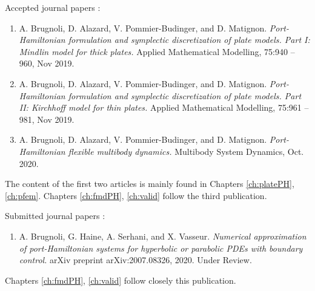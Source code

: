 Accepted journal papers \cite{brugnoli2019ammmin,brugnoli2019ammkir,brugnoli2020msd}:
\begin{enumerate}
\item A. Brugnoli, D. Alazard, V. Pommier-Budinger, and D. Matignon. \textit{Port-Hamiltonian formulation and symplectic discretization of plate models. Part I: Mindlin model for thick plates.} Applied Mathematical Modelling, 75:940 – 960, Nov 2019. 
\item A. Brugnoli, D. Alazard, V. Pommier-Budinger, and D. Matignon. \textit{Port-Hamiltonian formulation and symplectic discretization of plate models. Part II: Kirchhoff model for thin plates.} Applied Mathematical Modelling, 75:961 – 981, Nov 2019. 
\item A. Brugnoli, D. Alazard, V. Pommier-Budinger, and D. Matignon. \textit{Port-Hamiltonian flexible multibody dynamics.} Multibody System Dynamics, Oct. 2020. 
\end{enumerate}
The content of the first two articles is mainly found in Chapters \ref{ch:platePH}, \ref{ch:pfem}. 
Chapters \ref{ch:fmdPH}, \ref{ch:valid} follow the third publication.

Submitted journal papers \cite{brugnoli2020numerical}:
\begin{enumerate}
\item A. Brugnoli, G. Haine, A. Serhani, and X. Vasseur. \textit{Numerical approximation of port-Hamiltonian systems for hyperbolic or parabolic PDEs with boundary control.} arXiv preprint arXiv:2007.08326, 2020. Under Review. 
\end{enumerate}
Chapters \ref{ch:fmdPH}, \ref{ch:valid} follow closely this publication.

